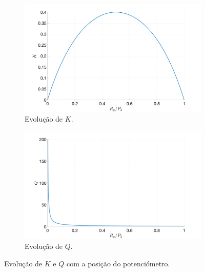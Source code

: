 \begin{figure}[ht]
     \begin{subfigure}[b]{0.48\textwidth}
         \centering
         \includegraphics[width=\textwidth]{Imagens/1_5_6_GainPotentiometer3.png}
         \caption{Evolução de $K$.}
     \end{subfigure}
     \hfill
     \begin{subfigure}[b]{0.48\textwidth}
         \centering
         \includegraphics[width=\textwidth]{Imagens/1_5_6_QPotentiometer3.png}
         \caption{Evolução de $Q$.}
     \end{subfigure}
    \caption{Evolução de $K$ e $Q$ com a posição do potenciómetro.}
    \label{fig:KQpot}
\end{figure}

